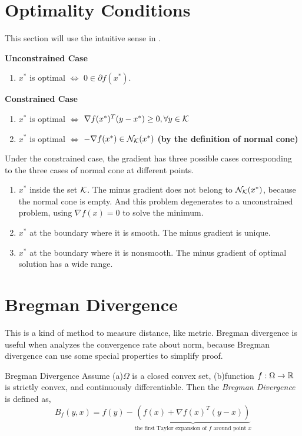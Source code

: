 	 
	 \section{Optimality Conditions}
	 	This section will use the intuitive sense in .
	 	
	 	\textbf{Unconstrained Case} 
	 	\begin{enumerate}
	 		\item $x^*$ is optimal $\Leftrightarrow$ $0\in\partial f(x^*)$.
	 	\end{enumerate} 
	 	
	 	\textbf{Constrained Case}
	 	\begin{enumerate}
		 	\item $x^*$ is optimal $\Leftrightarrow$ $\nabla f(x^*)^T(y-x^*)\ge 0,\forall y\in \mathcal{K}$
		 	\item $x^*$ is optimal $\Leftrightarrow$ $-\nabla f(x^*)\in\mathcal{N}_{\mathcal{K}}(x^*)$ \quad \textbf{(by the definition of normal cone)}
	 	\end{enumerate}
	 	
	 	Under the constrained case, the gradient has three possible cases corresponding to the three cases of normal cone at different points.
	 	\begin{enumerate}
	 		\item $x^*$ inside the set $\mathcal{K}$. The minus gradient does not belong to $\mathcal{N}_{\mathcal{K}}(x^*)$,  because the normal cone is empty. And this problem degenerates to a unconstrained problem, using $\nabla f(x)=0$ to solve the minimum.
	 		\item $x^*$ at the boundary where it is smooth. The minus gradient is unique.
	 		\item $x^*$ at the boundary where it is nonsmooth. The minus gradient of optimal solution has a wide range.
	 	\end{enumerate}
 	
 	\section{Bregman Divergence}
 	This is a kind of method to measure distance, like metric. Bregman divergence is useful when analyzes the convergence rate about norm, because Bregman divergence can use some special properties to simplify proof.
 	\begin{defn}{Bregman Divergence}{}
 		Assume (a)$\Omega$ is a closed convex set, (b)function $f:\Omega\rightarrow\mathbb{R}$ is strictly convex, and continuously differentiable. Then the \emph{Bregman Divergence} is defined as,
 		$$
 		B_f(y,x) = f(y) - \underbrace{(f(x)+\nabla f(x)^T(y-x))}_{\text{the first Taylor expansion of $f$ around point $x$}}
 		$$
 	\end{defn}
 
